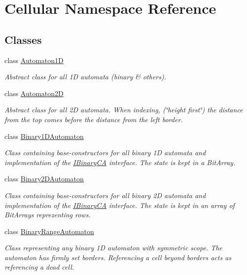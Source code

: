 \hypertarget{namespace_cellular}{}\section{Cellular Namespace Reference}
\label{namespace_cellular}
\subsection*{Classes}
\begin{DoxyCompactItemize}
\item 
class \hyperlink{class_cellular_1_1_automaton1_d}{Automaton1\+D}
\begin{DoxyCompactList}\small\item\em Abstract class for all 1\+D automata (binary \& others). \end{DoxyCompactList}\item 
class \hyperlink{class_cellular_1_1_automaton2_d}{Automaton2\+D}
\begin{DoxyCompactList}\small\item\em Abstract class for all 2\+D automata. When indexing, (\char`\"{}height first\char`\"{}) the distance from the top comes before the distance from the left border. \end{DoxyCompactList}\item 
class \hyperlink{class_cellular_1_1_binary1_d_automaton}{Binary1\+D\+Automaton}
\begin{DoxyCompactList}\small\item\em Class containing base-\/constructors for all binary 1\+D automata and implementation of the {\ttfamily \hyperlink{interface_cellular_1_1_i_binary_c_a}{I\+Binary\+C\+A}} interface. The state is kept in a {\ttfamily Bit\+Array}. \end{DoxyCompactList}\item 
class \hyperlink{class_cellular_1_1_binary2_d_automaton}{Binary2\+D\+Automaton}
\begin{DoxyCompactList}\small\item\em Class containing base-\/constructors for all binary 2\+D automata and implementation of the {\ttfamily \hyperlink{interface_cellular_1_1_i_binary_c_a}{I\+Binary\+C\+A}} interface. The state is kept in an array of {\ttfamily Bit\+Array}s reprezenting rows. \end{DoxyCompactList}\item 
class \hyperlink{class_cellular_1_1_binary_range_automaton}{Binary\+Range\+Automaton}
\begin{DoxyCompactList}\small\item\em Class representing any binary 1\+D automaton with symmetric scope. The automaton has firmly set borders. Referencing a cell beyond borders acts as referencing a dead cell. \end{DoxyCompactList}\item 

\end{DoxyCompactItemize}
